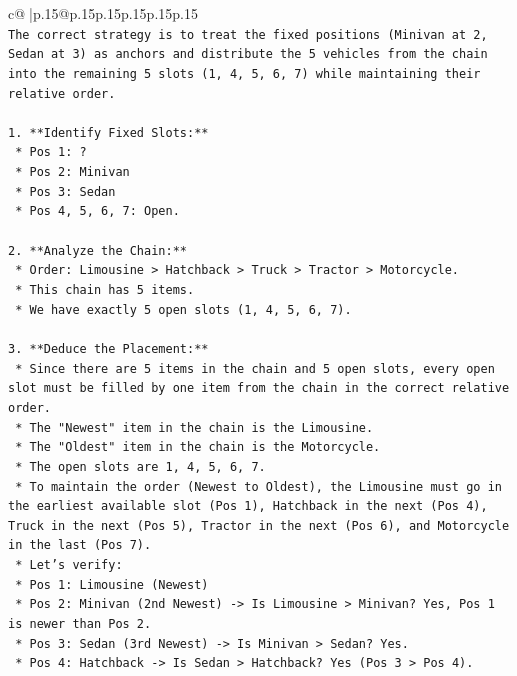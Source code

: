 \documentclass{article}
\begin{document}
{\begin{supertabular}{c@{$\;$}|p{.15\linewidth}@{}p{.15\linewidth}p{.15\linewidth}p{.15\linewidth}p{.15\linewidth}p{.15\linewidth}}
{{{\\ 
\texttt{The correct strategy is to treat the fixed positions (Minivan at 2, Sedan at 3) as anchors and distribute the 5 vehicles from the chain into the remaining 5 slots (1, 4, 5, 6, 7) while maintaining their relative order.} \\
\\ 
\texttt{1.  **Identify Fixed Slots:**} \\
\texttt{    *   Pos 1: ?} \\
\texttt{    *   Pos 2: Minivan} \\
\texttt{    *   Pos 3: Sedan} \\
\texttt{    *   Pos 4, 5, 6, 7: Open.} \\
\\ 
\texttt{2.  **Analyze the Chain:**} \\
\texttt{    *   Order: Limousine > Hatchback > Truck > Tractor > Motorcycle.} \\
\texttt{    *   This chain has 5 items.} \\
\texttt{    *   We have exactly 5 open slots (1, 4, 5, 6, 7).} \\
\\ 
\texttt{3.  **Deduce the Placement:**} \\
\texttt{    *   Since there are 5 items in the chain and 5 open slots, every open slot must be filled by one item from the chain in the correct relative order.} \\
\texttt{    *   The "Newest" item in the chain is the Limousine.} \\
\texttt{    *   The "Oldest" item in the chain is the Motorcycle.} \\
\texttt{    *   The open slots are 1, 4, 5, 6, 7.} \\
\texttt{    *   To maintain the order (Newest to Oldest), the Limousine must go in the earliest available slot (Pos 1), Hatchback in the next (Pos 4), Truck in the next (Pos 5), Tractor in the next (Pos 6), and Motorcycle in the last (Pos 7).} \\
\texttt{    *   Let's verify:} \\
\texttt{        *   Pos 1: Limousine (Newest)} \\
\texttt{        *   Pos 2: Minivan (2nd Newest) {-}> Is Limousine > Minivan? Yes, Pos 1 is newer than Pos 2.} \\
\texttt{        *   Pos 3: Sedan (3rd Newest) {-}> Is Minivan > Sedan? Yes.} \\
\texttt{        *   Pos 4: Hatchback {-}> Is Sedan > Hatchback? Yes (Pos 3 > Pos 4).} \\
}}}
\end{supertabular}}
\end{document}

